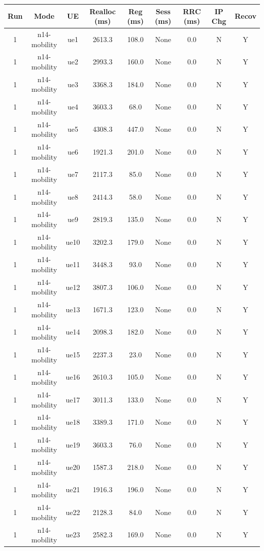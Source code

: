 \begin{table}[ht]
\centering
\begin{tabular}{|c|c|c|c|c|c|c|c|c|}
\hline
Run & Mode & UE & Realloc (ms) & Reg (ms) & Sess (ms) & RRC (ms) & IP Chg & Recov \\
\hline
1 & n14-mobility & ue1 & 2613.3 & 108.0 & None & 0.0 & N & Y \\
1 & n14-mobility & ue2 & 2993.3 & 160.0 & None & 0.0 & N & Y \\
1 & n14-mobility & ue3 & 3368.3 & 184.0 & None & 0.0 & N & Y \\
1 & n14-mobility & ue4 & 3603.3 & 68.0 & None & 0.0 & N & Y \\
1 & n14-mobility & ue5 & 4308.3 & 447.0 & None & 0.0 & N & Y \\
1 & n14-mobility & ue6 & 1921.3 & 201.0 & None & 0.0 & N & Y \\
1 & n14-mobility & ue7 & 2117.3 & 85.0 & None & 0.0 & N & Y \\
1 & n14-mobility & ue8 & 2414.3 & 58.0 & None & 0.0 & N & Y \\
1 & n14-mobility & ue9 & 2819.3 & 135.0 & None & 0.0 & N & Y \\
1 & n14-mobility & ue10 & 3202.3 & 179.0 & None & 0.0 & N & Y \\
1 & n14-mobility & ue11 & 3448.3 & 93.0 & None & 0.0 & N & Y \\
1 & n14-mobility & ue12 & 3807.3 & 106.0 & None & 0.0 & N & Y \\
1 & n14-mobility & ue13 & 1671.3 & 123.0 & None & 0.0 & N & Y \\
1 & n14-mobility & ue14 & 2098.3 & 182.0 & None & 0.0 & N & Y \\
1 & n14-mobility & ue15 & 2237.3 & 23.0 & None & 0.0 & N & Y \\
1 & n14-mobility & ue16 & 2610.3 & 105.0 & None & 0.0 & N & Y \\
1 & n14-mobility & ue17 & 3011.3 & 133.0 & None & 0.0 & N & Y \\
1 & n14-mobility & ue18 & 3389.3 & 171.0 & None & 0.0 & N & Y \\
1 & n14-mobility & ue19 & 3603.3 & 76.0 & None & 0.0 & N & Y \\
1 & n14-mobility & ue20 & 1587.3 & 218.0 & None & 0.0 & N & Y \\
1 & n14-mobility & ue21 & 1916.3 & 196.0 & None & 0.0 & N & Y \\
1 & n14-mobility & ue22 & 2128.3 & 84.0 & None & 0.0 & N & Y \\
1 & n14-mobility & ue23 & 2582.3 & 169.0 & None & 0.0 & N & Y \\

\end{tabular}
\end{table}
